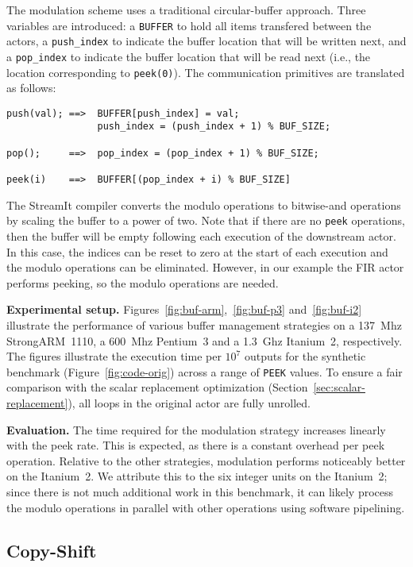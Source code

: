The modulation scheme uses a traditional circular-buffer approach.
Three variables are introduced: a {\tt BUFFER} to hold all items
transfered between the actors, a {\tt push\_index} to indicate the
buffer location that will be written next, and a {\tt pop\_index} to
indicate the buffer location that will be read next (i.e., the
location corresponding to {\tt peek(0)}).  The communication
primitives are translated as follows: 

{\scriptsize
\begin{verbatim}
push(val); ==>  BUFFER[push_index] = val;
                push_index = (push_index + 1) % BUF_SIZE;

pop();     ==>  pop_index = (pop_index + 1) % BUF_SIZE;

peek(i)    ==>  BUFFER[(pop_index + i) % BUF_SIZE]
\end{verbatim}}
\noindent The StreamIt compiler converts the modulo operations to
bitwise-and operations by scaling the buffer to a power of two.  Note
that if there are no {\tt peek} operations, then the buffer will be
empty following each execution of the downstream actor.  In this
case, the indices can be reset to zero at the start of each execution
and the modulo operations can be eliminated.  However, in our example
the FIR actor performs peeking, so the modulo operations are
needed.

{\bf Experimental setup.}  Figures~\ref{fig:buf-arm},~\ref{fig:buf-p3}
and~\ref{fig:buf-i2} illustrate the performance of various buffer
management strategies on a 137~Mhz StrongARM~1110, a 600~Mhz Pentium~3
and a 1.3~Ghz Itanium~2, respectively.  The figures illustrate the
execution time per $10^7$ outputs for the synthetic benchmark
(Figure~\ref{fig:code-orig}) across a range of {\tt PEEK} values.  To
ensure a fair comparison with the scalar replacement optimization
(Section~\ref{sec:scalar-replacement}), all loops in the original
actor are fully unrolled.

{\bf Evaluation.}  The time required for the modulation strategy
increases linearly with the peek rate.  This is expected, as there is
a constant overhead per peek operation.  Relative to the other
strategies, modulation performs noticeably better on the Itanium~2.
We attribute this to the six integer units on the Itanium~2; since
there is not much additional work in this benchmark, it can likely
process the modulo operations in parallel with other operations using
software pipelining.

\subsection{Copy-Shift}


